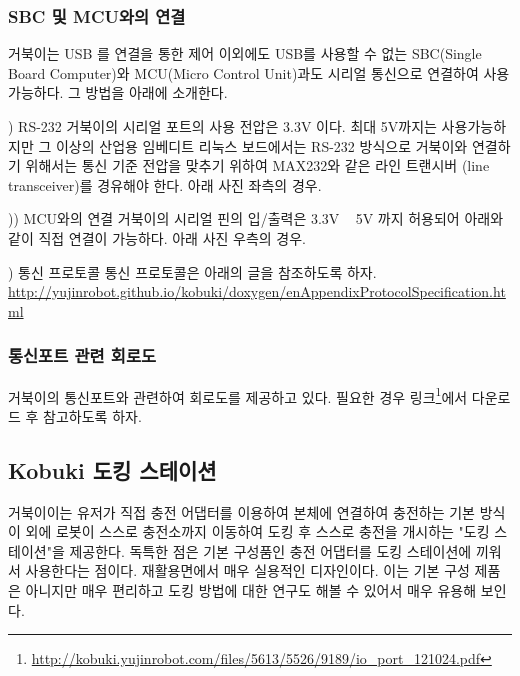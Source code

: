 \subsubsection{SBC 및 MCU와의 연결}

거북이는 USB 를 연결을 통한 제어 이외에도 USB를 사용할 수 없는 SBC(Single Board Computer)와 MCU(Micro Control Unit)과도 시리얼 통신으로 연결하여 사용 가능하다. 그 방법을 아래에 소개한다.

\setcounter{num}{0}

\vspace{\baselineskip}
\noindent
{}
\thenum) RS-232
거북이의 시리얼 포트의 사용 전압은 3.3V 이다. 최대 5V까지는 사용가능하지만 그 이상의 산업용 임베디트 리눅스 보드에서는 RS-232 방식으로 거북이와 연결하기 위해서는 통신 기준 전압을 맞추기 위하여 MAX232와 같은 라인 트랜시버 (line transceiver)를 경유해야 한다. 아래 사진 좌측의 경우.

\noindent
{}
\thenum)) MCU와의 연결
거북이의 시리얼 핀의 입/출력은 3.3V ~ 5V 까지 허용되어 아래와 같이 직접 연결이 가능하다. 아래 사진 우측의 경우.

\noindent
{}
\thenum) 통신 프로토콜
통신 프로토콜은 아래의 글을 참조하도록 하자.
\url{http://yujinrobot.github.io/kobuki/doxygen/enAppendixProtocolSpecification.html}

\subsubsection{통신포트 관련 회로도}

거북이의 통신포트와 관련하여 회로도를 제공하고 있다. 필요한 경우 링크\footnote{\url{http://kobuki.yujinrobot.com/files/5613/5526/9189/io_port_121024.pdf}}에서 다운로드 후 참고하도록 하자. 

\subsection{Kobuki 도킹 스테이션}

거북이이는 유저가 직접 충전 어댑터를 이용하여 본체에 연결하여 충전하는 기본 방식 이 외에 로봇이 스스로 충전소까지 이동하여 도킹 후 스스로 충전을 개시하는 "도킹 스테이션"을 제공한다. 독특한 점은 기본 구성품인 충전 어댑터를 도킹 스테이션에 끼워서 사용한다는 점이다. 재활용면에서 매우 실용적인 디자인이다. 이는 기본 구성 제품은 아니지만 매우 편리하고 도킹 방법에 대한 연구도 해볼 수 있어서 매우 유용해 보인다.

